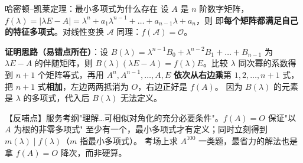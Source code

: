 


\begin{fdeep}{哈密顿--凯莱定理：最小多项式为什么存在}
设 $A$ 是 $n$ 阶数字矩阵，$f(\lambda)=|\lambda E-A|=\lambda^{n}+a_{1}\lambda^{n-1}+\dots+a_{n-1}\lambda+a_{n}$，则
即\textbf{每个矩阵都满足自己的特征多项式}。对线性变换 $\mathscr{A}$ 同理：$f(\mathscr{A})=\mathscr{O}$。

\textbf{证明思路（易错点所在）}：设 $B(\lambda)=\lambda^{n-1}B_{0}+\lambda^{n-2}B_{1}+\dots+B_{n-1}$ 为
$\lambda E-A$ 的伴随矩阵，则 $B(\lambda)(\lambda E-A)=f(\lambda)E$。比较 $\lambda$ 同次幂的系数得到
$n+1$ 个矩阵等式，再用 $A^{n},A^{n-1},\dots,A,E$ \textbf{依次从右边乘}第 $1,2,\dots,n+1$ 式，
把 $n+1$ 式\textbf{相加}，左边两两抵消为 $O$，右边正好是 $f(A)$。
因为 $B(\lambda)$ 的元素是 $\lambda$ 的多项式，代入后 $B(\lambda)$ 无法定义。

【反哺点】服务考纲"理解…可相似对角化的充分必要条件"。$f(A)=O$ 保证"以 $A$ 为根的非零多项式"
至少有一个，最小多项式才有定义；同时立刻得到 $m(\lambda)\mid f(\lambda)$（$m$ 指最小多项式）。
考场上求 $A^{100}$ 一类题，最省力的解法也是拿 $f(A)=O$ 降次，而非硬算。
\end{fdeep}

